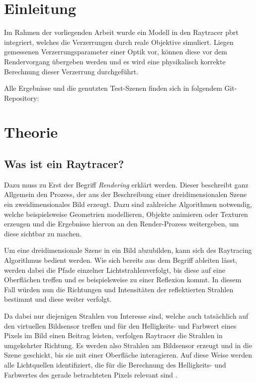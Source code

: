\section{Einleitung}

Im Rahmen der vorliegenden Arbeit wurde ein Modell in den Raytracer pbrt integriert, welches die Verzerrungen durch reale Objektive simuliert. Liegen gemessenen Verzerrungsparameter einer Optik vor, können diese vor dem Rendervorgang übergeben werden und es wird eine physikalisch korrekte Berechnung dieser Verzerrung durchgeführt.

Alle Ergebnisse und die genutzten Test-Szenen finden sich in folgendem Git-Repository: \cite{git-Distortion_Camera}

\section{Theorie}

\subsection{Was ist ein Raytracer?}\label{sec:Raytracer}

Dazu muss zu Erst der Begriff \textit{Rendering} erklärt werden. Dieser beschreibt ganz Allgemein den Prozess, der aus der Beschreibung einer dreidimensionalen Szene ein zweidimensionales Bild erzeugt. Dazu sind zahlreiche Algorithmen notwendig, welche beispielsweise Geometrien modellieren, Objekte animieren oder Texturen erzeugen und die Ergebnisse hiervon an den Render-Prozess weitergeben, um diese sichtbar zu machen. 

Um eine dreidimensionale Szene in ein Bild abzubilden, kann sich des Raytracing Algorithmus bedient werden. Wie sich bereits aus dem Begriff ableiten lässt, werden dabei die Pfade einzelner \glqq Lichtstrahlen\grqq{ }verfolgt, bis diese auf eine Oberflächen treffen und es beispielsweise zu einer Reflexion kommt. In diesem Fall würden nun die Richtungen und Intensitäten der reflektierten Strahlen bestimmt und diese weiter verfolgt.

Da dabei nur diejenigen Strahlen von Interesse sind, welche auch tatsächlich auf den virtuellen Bildsensor treffen und für den Helligkeits- und Farbwert eines Pixels im Bild einen Beitrag leisten, verfolgen Raytracer die Strahlen in umgekehrter Richtung. Es werden also Strahlen am Bildsensor erzeugt und in die Szene geschickt, bis sie mit einer Oberfläche interagieren. Auf diese Weise werden alle Lichtquellen identifiziert, die für die Berechnung des Helligkeits- und Farbwertes des gerade betrachteten Pixels relevant sind \cite{pbrt_book}. 

